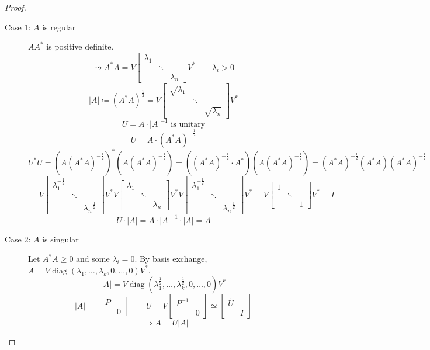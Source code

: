 \documentclass{article}
\newcommand{\card}[1]{\left|#1\right|}
\begin{document}
\begin{proof}
  \begin{description}
    \item[Case 1: $A$ is regular]
      $A A^*$ is positive definite.
      \[ \leadsto A^* A = V \begin{bmatrix} \lambda_1 & &  \\ & \ddots & \\ & & \lambda_n \end{bmatrix} V^* \qquad \lambda_i > 0 \]
      \[ \card{A} \coloneqq (A^* A)^{\frac12} = V \begin{bmatrix} \sqrt{\lambda_1} & &  \\ & \ddots & \\ & & \sqrt{\lambda_n} \end{bmatrix} V^* \]
      \[ U = A \cdot \card{A}^{-1} \text{ is unitary} \]
      \[ U = A \cdot (A^* A)^{-\frac12} \]
      \[ U^* U = (A(A^* A)^{-\frac12})^* (A (A^* A)^{-\frac12}) = ((A^* A)^{-\frac12} \cdot A^*) (A (A^* A)^{-\frac12}) = (A^* A)^{-\frac12} (A^* A) (A^* A)^{-\frac12} \]
      \[ = V \begin{bmatrix} \lambda_1^{-\frac12} & & \\ & \ddots & \\ & & \lambda_n^{-\frac12} \end{bmatrix} V^* V \begin{bmatrix} \lambda_1 & & \\ & \ddots & \\ & & \lambda_n \end{bmatrix} V^* V \begin{bmatrix} \lambda_1^{-\frac12} & & \\ & \ddots & \\ & & \lambda_n^{-\frac12} \end{bmatrix} V^* = V \begin{bmatrix} 1 & & \\ & \ddots & \\ & & 1 \end{bmatrix} V^* = I \]
      \[ U \cdot \card{A} = A \cdot \card{A}^{-1} \cdot \card{A} = A \]
    \item[Case 2: $A$ is singular]
      Let $A^* A \geq 0$ and some $\lambda_i = 0$.
      By basis exchange, $A = V \operatorname{diag}(\lambda_1, \dots, \lambda_k, 0, \dots, 0) V^*$.
      \[ \card{A} = V \operatorname{diag}(\lambda_1^{\frac12}, \dots, \lambda_k^{\frac12}, 0, \dots, 0) V^* \]
      \[ \card{A} = \begin{bmatrix} P & \\ & 0 \end{bmatrix} \qquad U = V \begin{bmatrix} P^{-1} & \\ & 0 \end{bmatrix} \simeq \begin{bmatrix} \tilde U & \\ & I \end{bmatrix} \]
      \[ \implies A = U \card{A} \]
  \end{description}
\end{proof}
\end{document}
